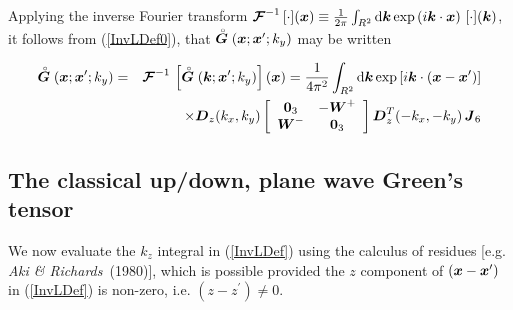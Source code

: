 Applying the inverse Fourier transform 
${\CB F}^{-1}\, [\cdot]({\bmi x}) \equiv \frac{1}{{2 \pi}} 
\int_{R^2 } {\rm d}{\bmi k} \exp \left(i {\bmi k}\cdot {\bmi x}\right)\, 
[\cdot] ({\bmi k})$, 
it follows from (\ref{InvLDef0}),
that $\rf{\bmi  G}({\bmi x};{\bmi x}^{\prime};k_y)$ 
may be written
\begin{samepage}
\begin{eqnarray} \label{InvLDef}
\rf{\bmi  G}({\bmi x};{\bmi x}^{\prime};k_y)&=&{\CB F}^{-1}\, \left[\rf{\bmi  G}({\bmi 
k};{\bmi x}^{\prime};k_y) \right]({\bmi x}) =\frac{1}{4 \pi^2} 
\int_{R^2 } {\rm d}{\bmi k} \exp \left[i {\bmi k}\cdot ({\bmi x}-{\bmi 
x}^{\prime})\right]\nonumber\\
&&\times {\bmi  D}_{z}({k}_{x},{k}_{y})
\left[{\begin{array}{cc}{\bf 0}_{3}&-{\bmi W}^{+}\\
{\bmi W}^{-}&{\bf 0}_{3}\end{array}}\right]{\bmi  D}_{z}^{T}(-{k}_{x},-{k}_{y})
\,{\bmi  J}_6
\end{eqnarray}
\end{samepage} 

\subsection{The classical up/down, plane wave Green's tensor}
We now evaluate the $k_{z}$ integral in (\ref{InvLDef}) using the calculus of 
residues [e.g. {\em Aki \& Richards\/}~(1980)], which is possible provided
the $z$ component of  $({\bmi x}-{\bmi x}^{\prime})$ in  (\ref{InvLDef}) 
is non-zero, i.e. $({z}-{z}^{\prime})\not=0 $.

